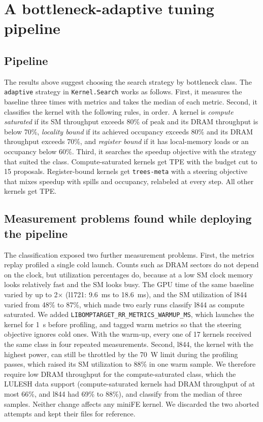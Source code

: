 \documentclass[10pt]{article}
\newcommand{\x}{\ensuremath{\times}}
\newcommand{\code}[1]{\texttt{#1}}
\begin{document}
\section{A bottleneck-adaptive tuning pipeline}
\label{sec:adaptive}

\subsection{Pipeline}
The results above suggest choosing the search strategy by bottleneck class.
The \code{adaptive} strategy in \code{Kernel.Search} works as follows. First,
it measures the baseline three times with metrics and takes the median of
each metric. Second, it classifies the kernel with the following rules, in
order. A kernel is \emph{compute saturated} if its SM throughput exceeds
80\% of peak and its DRAM throughput is below 70\%, \emph{locality bound} if
its achieved occupancy exceeds 80\% and its DRAM throughput exceeds 70\%,
and \emph{register bound} if it has local-memory loads or an occupancy below
60\%. Third, it searches the speedup objective with the strategy that suited
the class. Compute-saturated kernels get TPE with the budget cut to 15
proposals. Register-bound kernels get \code{trees-meta} with a steering
objective that mixes speedup with spills and occupancy, relabeled at every
step. All other kernels get TPE.

\subsection{Measurement problems found while deploying the pipeline}
The classification exposed two further measurement problems. First, the
metrics replay profiled a single cold launch. Counts such as DRAM sectors do
not depend on the clock, but utilization percentages do, because at a low SM
clock memory looks relatively fast and the SM looks busy. The GPU time of the
same baseline varied by up to 2\x{} (l1721: 9.6~ms to 18.6~ms), and the SM
utilization of l844 varied from 48\% to 87\%, which made two early runs
classify l844 as compute saturated. We added
\code{LIBOMPTARGET\_RR\_METRICS\_WARMUP\_MS}, which launches the kernel for
1~s before profiling, and tagged warm metrics so that the steering objective
ignores cold ones. With the warm-up, every one of 17 kernels received the
same class in four repeated measurements. Second, l844, the kernel with the
highest power, can still be throttled by the 70~W limit during the profiling
passes, which raised its SM utilization to 88\% in one warm sample. We
therefore require low DRAM throughput for the compute-saturated class, which
the LULESH data support (compute-saturated kernels had DRAM throughput of at
most 66\%, and l844 had 69\% to 88\%), and classify from the median of three
samples. Neither change affects any miniFE kernel. We discarded the two
aborted attempts and kept their files for reference.
\end{document}
